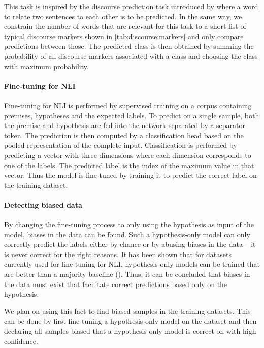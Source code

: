 \documentclass[12pt,a4paper]{article}
\begin{document}
This task is inspired by the discourse prediction task introduced by \cite{dissent} where a word to relate two sentences to each other is to be predicted. In the same way, we constrain the number of words that are relevant for this task to a short list of typical discourse markers shown in \autoref{tab:discourse:markers} and only compare predictions between those. The predicted class is then obtained by summing the probability of all discourse markers associated with a class and choosing the class with maximum probability.

\paragraph{Fine-tuning for \acs{NLI}}

Fine-tuning for \acs{NLI} is performed by supervised training on a corpus containing premises, hypotheses and the expected labels. To predict on a single sample, both the premise and hypothesis are fed into the network separated by a separator token. The prediction is then computed by a classification head based on the pooled representation of the complete input. Classification is performed by predicting a vector with three dimensions where each dimension corresponds to one of the labels. The predicted label is the index of the maximum value in that vector. Thus the model is fine-tuned by training it to predict the correct label on the training dataset.

\paragraph{Detecting biased data}

By changing the fine-tuning process to only using the hypothesis as input of the model, biases in the data can be found. Such a hypothesis-only model can only correctly predict the labels either by chance or by abusing biases in the data -- it is never correct for the right reasons. It has been shown that for datasets currently used for fine-tuning for \acs{NLI}, hypothesis-only models can be trained that are better than a majority baseline (\cite{hyponly}). Thus, it can be concluded that biases in the data must exist that facilitate correct predictions based only on the hypothesis.

We plan on using this fact to find biased samples in the training datasets. This can be done by first fine-tuning a hypothesis-only model on the dataset and then declaring all samples biased that a hypothesis-only model is correct on with high confidence.
\end{document}
